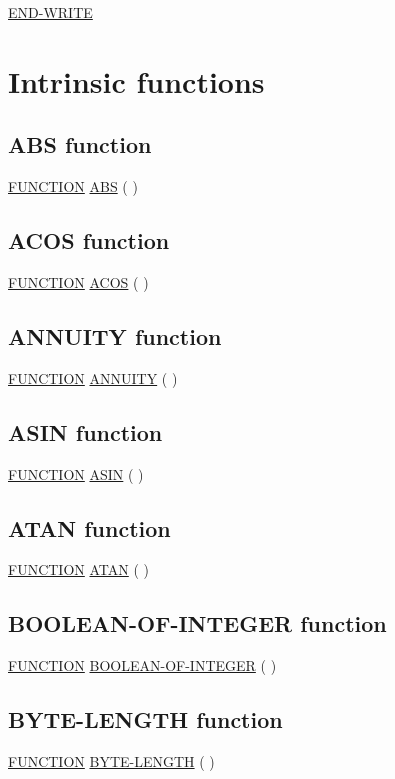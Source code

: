 \documentclass[a4paper,oneside,svgnames]{scrbook}
\makeatletter
\newcommand{\key}[1]{\underline{#1}}
\newcommand{\pending}[1]{%
  \textcolor{gray!75}{#1}}
\newenvironment{0-1}{$\left[ \begin{tabular}{@{}l@{}}}{\end{tabular} \right]$}
\makeatother
\begin{document}
\begin{0-1}
  \key{END-WRITE}
\end{0-1}

\chapter{Intrinsic functions}

\section{ABS function}

\key{FUNCTION} \key{ABS} ( \argument )

\section{ACOS function}

\key{FUNCTION} \key{ACOS} ( \argument)

\section{ANNUITY function}

\key{FUNCTION} \key{ANNUITY} ( \argument \argument )

\section{ASIN function}

\key{FUNCTION} \key{ASIN} ( \argument )

\section{ATAN function}

\key{FUNCTION} \key{ATAN} ( \argument )

\section{BOOLEAN-OF-INTEGER function}

\pending{
  \key{FUNCTION} \key{BOOLEAN-OF-INTEGER} ( \argument \argument )
}

\section{BYTE-LENGTH function}

\key{FUNCTION} \key{BYTE-LENGTH} ( \argument )
\end{document}
